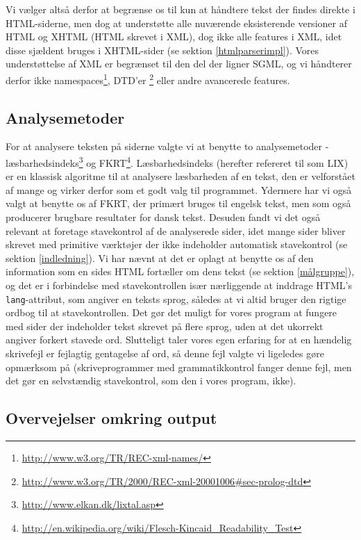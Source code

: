 \documentclass[a4paper,oneside]{memoir}
\begin{document}
Vi vælger altså derfor at begrænse os til kun at håndtere tekst der
findes direkte i HTML-siderne, men dog at understøtte alle nuværende
eksisterende versioner af HTML og XHTML (HTML skrevet i XML), dog ikke
alle features i XML, idet disse sjældent bruges i XHTML-sider (se
sektion \ref{htmlparserimpl}). Vores understøttelse af XML er
begrænset til den del der ligner SGML, og vi håndterer derfor ikke
namespaces\footnote{\url{http://www.w3.org/TR/REC-xml-names/}},
DTD'er \footnote{\url{http://www.w3.org/TR/2000/REC-xml-20001006\#sec-prolog-dtd}}
eller andre avancerede features.

\subsection{Analysemetoder}
\label{analysemetoder}
For at analysere teksten på siderne valgte vi at benytte to
analysemetoder -
læsbarhedsindeks\footnote{\url{http://www.elkan.dk/lixtal.asp}} og
FKRT\footnote{\url{http://en.wikipedia.org/wiki/Flesch-Kincaid_Readability_Test}}.
Læsbarhedsindeks (herefter refereret til som LIX) er en klassisk
algoritme til at analysere læsbarheden af en tekst, den er velforstået
af mange og virker derfor som et godt valg til programmet. Ydermere
har vi også valgt at benytte os af FKRT, der primært bruges til
engelsk tekst, men som også producerer brugbare resultater for dansk
tekst. Desuden fandt vi det også relevant at foretage stavekontrol af
de analyserede sider, idet mange sider bliver skrevet med primitive
værktøjer der ikke indeholder automatisk stavekontrol (se sektion
\ref{indledning}). Vi har nævnt at det er oplagt at benytte os af den
information som en sides HTML fortæller om dens tekst (se sektion
\ref{målgruppe}), og det er i forbindelse med stavekontrollen især
nærliggende at inddrage HTML's \texttt{lang}-attribut, som angiver en
teksts sprog, således at vi altid bruger den rigtige ordbog til at
stavekontrollen. Det gør det muligt for vores program at fungere med
sider der indeholder tekst skrevet på flere sprog, uden at det
ukorrekt angiver forkert stavede ord. Slutteligt taler vores egen
erfaring for at en hændelig skrivefejl er fejlagtig gentagelse af ord,
så denne fejl valgte vi ligeledes gøre opmærksom på (skriveprogrammer
med grammatikkontrol fanger denne fejl, men det gør en selvstændig
stavekontrol, som den i vores program, ikke).

\subsection{Overvejelser omkring output}
\end{document}
